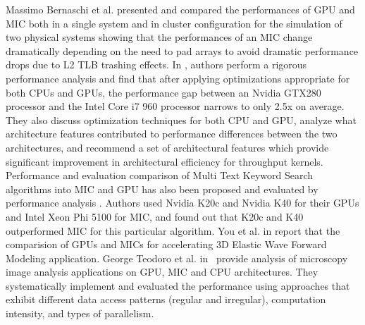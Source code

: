 
Massimo Bernaschi et al. \cite{R:10} presented and compared the performances of GPU and MIC both in a single system and in cluster configuration for the simulation of two physical systems showing that the performances of an MIC change dramatically depending on the need to pad arrays to avoid dramatic performance drops due to L2 TLB trashing effects. In \cite{R:11}, authors perform a rigorous performance analysis and find that after applying optimizations appropriate for both CPUs and GPUs, the performance gap between an Nvidia GTX280 processor and the Intel Core i7 960 processor narrows to only 2.5x on average. They also discuss optimization techniques for both CPU and GPU, analyze what architecture features contributed to performance differences between the two architectures, and recommend a set of architectural features which provide significant improvement in architectural efficiency for throughput kernels. Performance and evaluation comparison of Multi Text Keyword Search algorithms into MIC and GPU has also been proposed and evaluated by performance analysis \cite{R:12}. Authors used Nvidia K20c and Nvidia K40 for their GPUs and Intel Xeon Phi 5100 for MIC, and found out that K20c and K40 outperformed MIC for this particular algorithm. 
You et al. in \cite{R:8} report that the comparision of GPUs and MICs for accelerating 3D Elastic Wave Forward
Modeling application. 
George Teodoro et al. in~\cite{R:9} provide analysis of microscopy image analysis applications on GPU, MIC and CPU architectures. 
They systematically implement and evaluated the performance using approaches that exhibit different data access patterns (regular and irregular), computation intensity, and types of parallelism. %




